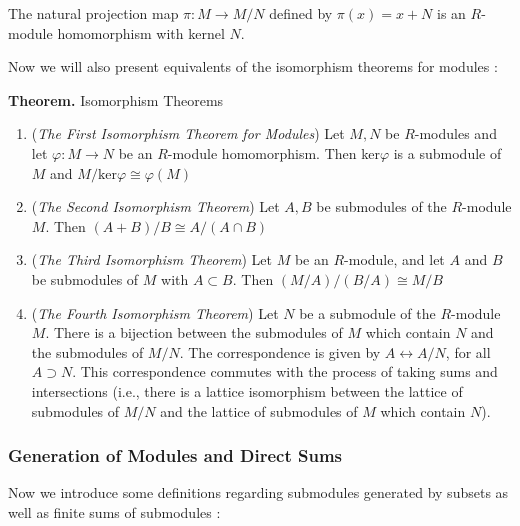 \documentclass[11pt, reqno]{amsart}
\theoremstyle{plain}
\theoremstyle{definition}
\theoremstyle{example}
\begin{document}
The natural projection map $\pi: M \to M/N$ defined by $\pi(x) = x + N$ is an $R$-module homomorphism with kernel $N$.

\par
Now we will also present equivalents of the isomorphism theorems for modules \cite[\S 10.2, p. 345]{dummit}:

\par
\textbf{Theorem.} Isomorphism Theorems
\begin{enumerate}
\item (\textit{The First Isomorphism Theorem for Modules}) Let $M, N$ be $R$-modules and let $\varphi: M \to N$ be an $R$-module homomorphism. Then ker$\varphi$ is a submodule of $M$ and $M/\text{ker}\varphi \cong \varphi(M)$
\item (\textit{The Second Isomorphism Theorem}) Let $A, B$ be submodules of the $R$-module $M$. Then $(A+B)/B \cong A/(A \cap B)$
\item (\textit{The Third Isomorphism Theorem}) Let $M$ be an $R$-module, and let $A$ and $B$ be submodules of $M$ with $A \subset B$. Then $(M/A)/(B/A) \cong M/B$
\item (\textit{The Fourth Isomorphism Theorem}) Let $N$ be a submodule of the $R$-module $M$. There is a bijection between the submodules of $M$ which contain $N$ and the submodules of $M/N$. The correspondence is given by $A \longleftrightarrow A/N$, for all $A \supset N$. This correspondence commutes with the process of taking sums and intersections (i.e., there is a lattice isomorphism between the lattice of submodules of $M/N$ and the lattice of submodules of $M$ which contain $N$).
\end{enumerate}

\subsubsection{Generation of Modules and Direct Sums}

Now we introduce some definitions regarding submodules generated by subsets as well as finite sums of submodules \cite[\S 10.3, p. 351]{dummit}:
\end{document}
